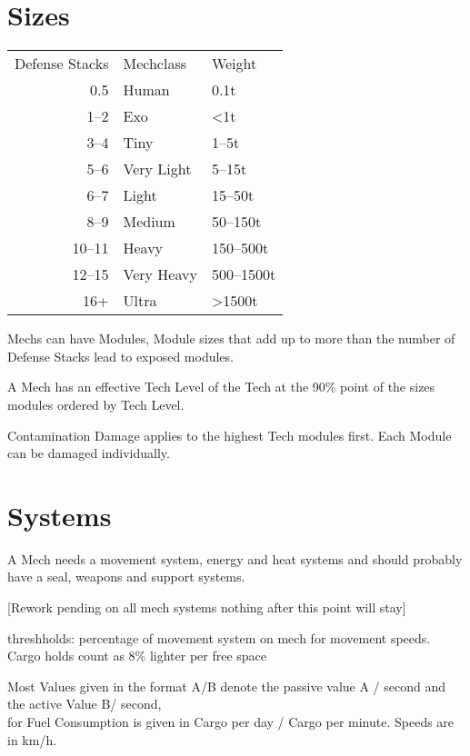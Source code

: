 \section{Sizes}\label{sec:sizes}
\begin{tabular}{r|ll}
    Defense Stacks &Mechclass & Weight\\
    0.5 &Human & 0.1t\\
    1--2 &Exo& <1t\\
    3--4 &Tiny & 1--5t\\
    5--6 &Very Light& 5--15t\\
    6--7 &Light& 15--50t\\
    8--9 &Medium& 50--150t\\
    10--11 &Heavy& 150--500t\\
    12--15 &Very Heavy& 500--1500t\\
    16+ &Ultra& >1500t\\
\end{tabular}\newline
Mechs can have Modules, Module sizes that add up to more than the number of Defense Stacks lead to exposed modules.

A Mech has an effective Tech Level of the Tech at the 90\% point of the sizes modules ordered by Tech Level.\par
Contamination Damage applies to the highest Tech modules first.
Each Module can be damaged individually.\par
\section{Systems}\label{sec:systems}
A Mech needs a movement system, energy and heat systems and should probably have a seal, weapons and support systems.



[Rework pending on all mech systems nothing after this point will stay]



threshholds: percentage of movement system on mech for movement speeds.
Cargo holds count as 8\% lighter per
free space\par
Most Values given in the format A/B denote the passive value A / second and the active Value B/ second, \\
for Fuel Consumption is given in Cargo per day / Cargo per minute.
Speeds are in km/h.
